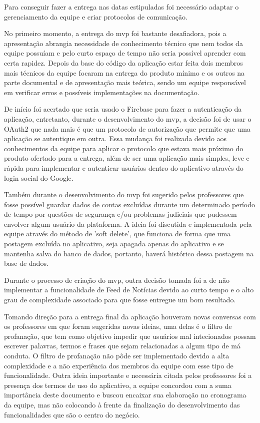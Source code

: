 Para conseguir fazer a entrega nas datas estipuladas foi necessário adaptar o gerenciamento da equipe e criar protocolos de comunicação. 

No primeiro momento, a entrega do \ac{mvp} foi bastante desafiadora, pois a apresentação abrangia necessidade de conhecimento técnico que nem todos da equipe possuíam e pelo curto espaço de tempo não seria possível aprender com certa rapidez. Depois da base do código da aplicação estar feita dois membros mais técnicos da equipe focaram na entrega do produto mínimo e os outros na parte documental e de apresentação mais teórica, sendo um equipe responsável em verificar erros e possíveis implementações na documentação.

De início foi acertado que seria usado o Firebase para fazer a autenticação da aplicação, entretanto, durante o desenvolvimento do \ac{mvp}, a decisão foi de usar o OAuth2 que nada mais é que um protocolo de autorização que permite que uma aplicação se autentique em outra. Essa mudança foi realizada devido aos conhecimentos da equipe para aplicar o protocolo que estava mais próximo do produto ofertado para a entrega, além de ser uma aplicação mais simples, leve e rápida para implementar e autenticar usuários dentro do aplicativo através do login social do Google. 

Também durante o desenvolvimento do \ac{mvp} foi sugerido pelos professores que fosse possível guardar dados de contas excluídas durante um determinado período de tempo por questões de segurança e/ou problemas judiciais que pudessem envolver algum usuário da plataforma. A ideia foi discutida e implementada pela equipe através do método de 'soft delete', que funciona de forma que uma postagem excluída no aplicativo, seja apagada apenas do aplicativo e se mantenha salva do banco de dados, portanto, haverá histórico dessa postagem na base de dados.

Durante o processo de criação do \ac{mvp}, outra decisão tomada foi a de não implementar a funcionalidade de Feed de Notícias devido ao curto tempo e o alto grau de complexidade associado para que fosse entregue um bom resultado.

Tomando direção para a entrega final da aplicação houveram novas conversas com os professores em que foram sugeridas novas ideias, uma delas é o filtro de profanação, que tem como objetivo impedir que usuários mal intecionados possam escrever palavras, termos e frases que sejam relacionadas a algum tipo de má conduta. O filtro de profanação não pôde ser implementado devido a alta complexidade e a não experiência dos membros da equipe com esse tipo de funcionalidade. Outra ideia importante e necessária citada pelos professores foi a presença dos termos de uso do aplicativo, a equipe concordou com a suma importância deste documento e buscou encaixar sua elaboração no cronograma da equipe, mas não colocando à frente da finalização do desenvolvimento das funcionalidades que são o centro do negócio. 

